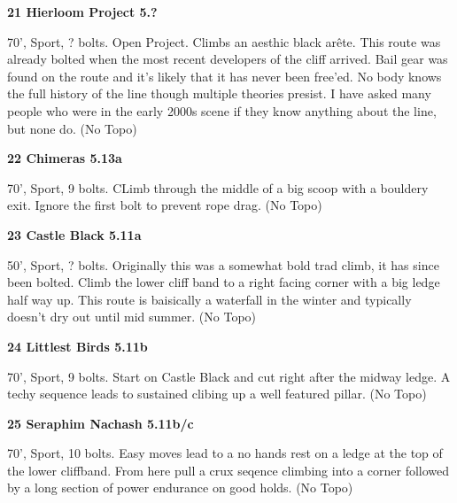 \begin{multicols}{2}
\needspace{1.5cm}
\label{rt:Hierloom Project}
\colorbox{black!20}{
\parbox{0.95\linewidth}{
\textbf{
21 Hierloom Project 5.?  
}}}
\begin{adjustwidth}{0.5cm}{}			
70', Sport, ? bolts. Open Project. Climbs an aesthic black arête. This route was already bolted when the most recent developers of the cliff arrived. Bail gear was found on the route and it's likely that it has never been free'ed. No body knows the full history of the line though multiple theories presist. I have asked many people who were in the early 2000s scene if they know anything about the line, but none do.
  (No Topo)
\end{adjustwidth}




\needspace{1.5cm}
\label{rt:Chimeras}
\colorbox{Goldenrod!20}{
\parbox{0.95\linewidth}{
\textbf{
22 Chimeras 5.13a  
}}}
\begin{adjustwidth}{0.5cm}{}			
70', Sport, 9 bolts. CLimb through the middle of a big scoop with a bouldery exit. Ignore the first bolt to prevent rope drag.
  (No Topo)
\end{adjustwidth}




\needspace{1.5cm}
\label{rt:Castle Black}
\colorbox{RoyalBlue!20}{
\parbox{0.95\linewidth}{
\textbf{
23 Castle Black 5.11a  
}}}
\begin{adjustwidth}{0.5cm}{}			
50', Sport, ? bolts. Originally this was a somewhat bold trad climb, it has since been bolted. Climb the lower cliff band to a right facing corner with a big ledge half way up. This route is baisically a waterfall in the winter and typically doesn't dry out until mid summer.
  (No Topo)
\end{adjustwidth}




\needspace{1.5cm}
\label{rt:Littlest Birds}
\colorbox{RoyalBlue!20}{
\parbox{0.95\linewidth}{
\textbf{
24 Littlest Birds 5.11b  
}}}
\begin{adjustwidth}{0.5cm}{}			
70', Sport, 9 bolts. Start on Castle Black and cut right after the midway ledge. A techy sequence leads to sustained clibing up a well featured pillar.
  (No Topo)
\end{adjustwidth}




\needspace{1.5cm}
\label{rt:Seraphim Nachash}
\colorbox{RoyalBlue!20}{
\parbox{0.95\linewidth}{
\textbf{
25 Seraphim Nachash 5.11b/c  
}}}
\begin{adjustwidth}{0.5cm}{}			
70', Sport, 10 bolts. Easy moves lead to a no hands rest on a ledge at the top of the lower cliffband. From here pull a crux seqence climbing into a corner followed by a long section of power endurance on good holds.
  (No Topo)
\end{adjustwidth}





\end{multicols}
